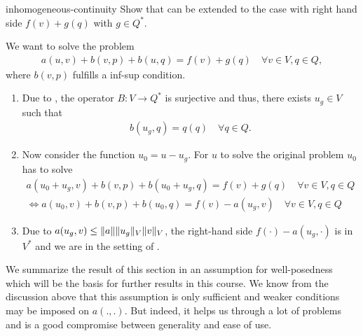 \begin{Problem}{inhomogeneous-continuity}
  Show that  can be extended to the
  case with right hand side $f(v)+g(q)$ with $g\in Q^*$.

\begin{solution}
  We want to solve the problem
  \begin{align*}
    a(u,v) + b(v,p) + b(u,q) = f(v)+g(q) \quad\forall v\in V, q\in Q,
  \end{align*}
  where $b(v,p)$ fulfills a inf-sup condition.

  \begin{enumerate}
  \item Due to , the
    operator $B: V\to Q^*$ is surjective and thus, there exists
    $u_g\in V$ such that
    \begin{gather*}
      b(u_g,q) = q(q) \quad\forall q\in Q.
    \end{gather*}
  \item Now consider the function $u_0 = u-u_g$. For $u$ to solve the
    original problem $u_0$ has to solve
    \begin{align*}
      a(u_0+u_g,v) + b(v,p) + b(u_0+u_g,q) = f(v)+g(q) \quad\forall v\in V, q\in Q\\
      \Leftrightarrow a(u_0,v) + b(v,p) + b(u_0,q) = f(v)-a(u_g,v) \quad\forall v\in V, q\in Q
    \end{align*}
  \item Due to $a(u_g,v) \leq \lVert a\rVert\lVert u_g\rVert_V\lVert v\rVert_V$,
    the right-hand side $f(\cdot)-a(u_g,\cdot)$ is in $V^*$
    and we are in the setting of
    .
  \end{enumerate}
\end{solution}
\end{Problem}

\begin{intro}
  We summarize the result of this section in an assumption for
  well-posedness which will be the basis for further results in this
  course. We know from the discussion above that this assumption is
  only sufficient and weaker conditions may be imposed on
  $a(.,.)$. But indeed, it helps us through a lot of problems and is a
  good compromise between generality and ease of use.
\end{intro}

